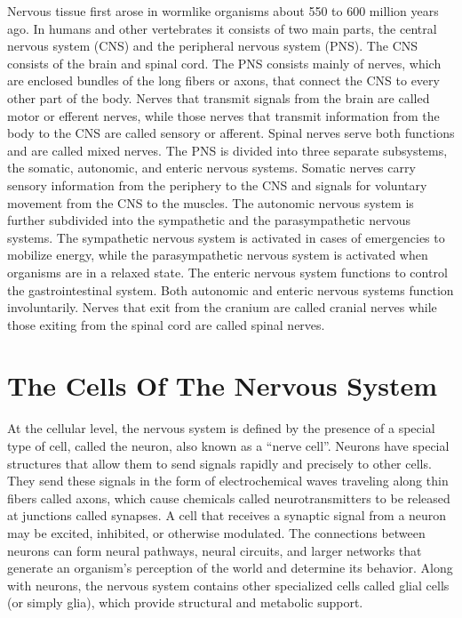Nervous tissue first arose in wormlike organisms about 550 to 600 million years ago. In humans and other vertebrates it consists of two main parts, the central nervous system (CNS) and the peripheral nervous system (PNS). The CNS consists of the brain and spinal cord. The PNS consists mainly of nerves, which are enclosed bundles of the long fibers or axons, that connect the CNS to every other part of the body. Nerves that transmit signals from the brain are called motor or efferent nerves, while those nerves that transmit information from the body to the CNS are called sensory or afferent. Spinal nerves serve both functions and are called mixed nerves. The PNS is divided into three separate subsystems, the somatic, autonomic, and enteric nervous systems. Somatic nerves carry sensory information from the periphery to the CNS and signals for voluntary movement from the CNS to the muscles. The autonomic nervous system is further subdivided into the sympathetic and the parasympathetic nervous systems. The sympathetic nervous system is activated in cases of emergencies to mobilize energy, while the parasympathetic nervous system is activated when organisms are in a relaxed state. The enteric nervous system functions to control the gastrointestinal system. Both autonomic and enteric nervous systems function involuntarily. Nerves that exit from the cranium are called cranial nerves while those exiting from the spinal cord are called spinal nerves.

\hypertarget{the-cells-of-the-nervous-system}{%
\section{The Cells Of The Nervous System}\label{the-cells-of-the-nervous-system}}

At the cellular level, the nervous system is defined by the presence of a special type of cell, called the neuron, also known as a ``nerve cell''. Neurons have special structures that allow them to send signals rapidly and precisely to other cells. They send these signals in the form of electrochemical waves traveling along thin fibers called axons, which cause chemicals called neurotransmitters to be released at junctions called synapses. A cell that receives a synaptic signal from a neuron may be excited, inhibited, or otherwise modulated. The connections between neurons can form neural pathways, neural circuits, and larger networks that generate an organism's perception of the world and determine its behavior. Along with neurons, the nervous system contains other specialized cells called glial cells (or simply glia), which provide structural and metabolic support.

